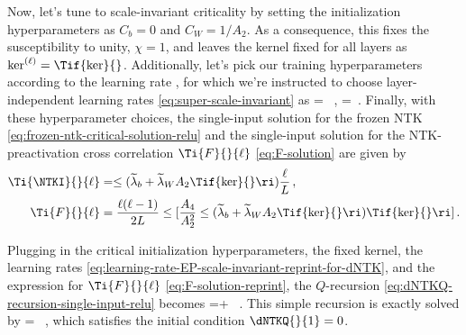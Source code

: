 Now, let's tune to scale-invariant criticality by setting the initialization hyperparameters as $C_b=0$ and $C_W=1/A_2$. As a consequence, this fixes the susceptibility to unity, $\chi=1$, and leaves the kernel fixed for all layers as $\ker^{(\ell)}=\Tif{\ker}{}$. Additionally, let's pick our training hyperparameters according to the learning rate , for which we're instructed to choose layer-independent learning rates \eqref{eq:super-scale-invariant} as 
\be\label{eq:learning-rate-EP-scale-invariant-reprint-for-dNTK}
\Lb{\ell} =  \, , \qquad \LW{\ell} =   \,.
\ee
Finally, with these hyperparameter choices, the single-input solution for the frozen NTK \eqref{eq:frozen-ntk-critical-solution-relu} and the single-input solution for the NTK-preactivation cross correlation $\Ti{F}{}{\ell}$ \eqref{eq:F-solution} are given by
\begin{align}\label{eq:frozen-ntk-critical-solution-relu-reprint} 
\Ti{\NTKI}{}{\ell}&=\le(\widetilde{\lambda}_b+\widetilde{\lambda}_W A_2 \Tif{\ker}{}\ri)\frac{\ell}{L}\, , \\
\Ti{F}{}{\ell}&=\frac{\ell(\ell-1)}{2L}\le[\frac{A_4}{A_2^2} \le(\widetilde{\lambda}_b+\widetilde{\lambda}_W A_2 \Tif{\ker}{}\ri)\Tif{\ker}{}\ri] \, .
\label{eq:F-solution-reprint}
\end{align}


Plugging in the critical initialization hyperparameters, the fixed kernel, the learning rates \eqref{eq:learning-rate-EP-scale-invariant-reprint-for-dNTK}, and the expression for $\Ti{F}{}{\ell}$ \eqref{eq:F-solution-reprint}, the $Q$-recursion \eqref{eq:dNTKQ-recursion-single-input-relu} becomes
\be
{}=\dNTKQ{}{\ell}+ \, .
\ee
This simple recursion is exactly solved by
\be\label{eq:Q-solution-scale-invariant}
\dNTKQ{}{\ell}= \, ,
\ee
which satisfies the initial condition $\dNTKQ{}{1}=0$. 

